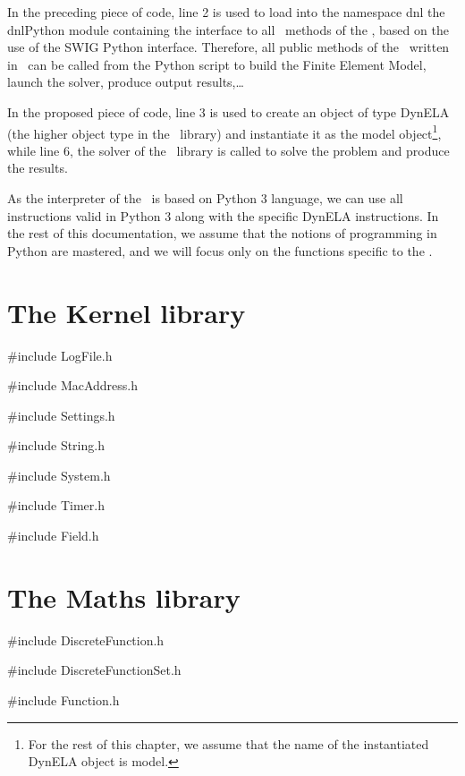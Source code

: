 In the preceding piece of code, line 2 is used to load into the namespace \textsf{dnl} the \textsf{dnlPython} module containing the interface to all \Cpp~methods of the \DynELA, based on the use of the SWIG Python interface. Therefore, all public methods of the \DynELA~written in \Cpp~can be called from the Python script to build the Finite Element Model, launch the solver, produce output results,\ldots

In the proposed piece of code, line 3 is used to create an object of type \textsf{DynELA} (the higher object type in the \DynELA~library) and instantiate it as the \textsf{model} object\footnote{For the rest of this chapter, we assume that the name of the instantiated \textsf{DynELA} object is \textsf{model.}}, while line 6, the solver of the \DynELA~library is called to solve the problem and produce the results.

As the interpreter of the \DynELA~is based on Python 3 language, we can use all instructions valid in Python 3 along with the specific DynELA instructions. In the rest of this documentation, we assume that the notions of programming in Python are mastered, and we will focus only on the functions specific to the \DynELA.

\section{The Kernel library}

\#include \textquotedbl LogFile.h\textquotedbl{}

\#include \textquotedbl MacAddress.h\textquotedbl{}

\#include \textquotedbl Settings.h\textquotedbl{}

\#include \textquotedbl String.h\textquotedbl{}

\#include \textquotedbl System.h\textquotedbl{}

\#include \textquotedbl Timer.h\textquotedbl{}

\#include \textquotedbl Field.h\textquotedbl{}

\section{The Maths library}

\#include \textquotedbl DiscreteFunction.h\textquotedbl{}

\#include \textquotedbl DiscreteFunctionSet.h\textquotedbl{}

\#include \textquotedbl Function.h\textquotedbl{}

